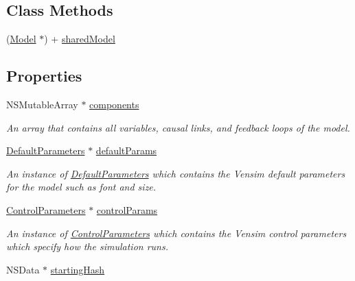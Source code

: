 \subsection*{Class Methods}
\begin{DoxyCompactItemize}
\item 
(\hyperlink{interface_model}{Model} $\ast$) + \hyperlink{interface_model_a4f1d39e1881443e4ecd87d660e9c91b4}{shared\-Model}
\end{DoxyCompactItemize}
\subsection*{Properties}
\begin{DoxyCompactItemize}
\item 
\hypertarget{interface_model_a84e232bb9b9692876f48dc2e95c8c2ab}{N\-S\-Mutable\-Array $\ast$ \hyperlink{interface_model_a84e232bb9b9692876f48dc2e95c8c2ab}{components}}\label{interface_model_a84e232bb9b9692876f48dc2e95c8c2ab}

\begin{DoxyCompactList}\small\item\em An array that contains all variables, causal links, and feedback loops of the model. \end{DoxyCompactList}\item 
\hypertarget{interface_model_a4be35dd9732f61e8d31f36497e615ac4}{\hyperlink{interface_default_parameters}{Default\-Parameters} $\ast$ \hyperlink{interface_model_a4be35dd9732f61e8d31f36497e615ac4}{default\-Params}}\label{interface_model_a4be35dd9732f61e8d31f36497e615ac4}

\begin{DoxyCompactList}\small\item\em An instance of \hyperlink{interface_default_parameters}{Default\-Parameters} which contains the Vensim default parameters for the model such as font and size. \end{DoxyCompactList}\item 
\hypertarget{interface_model_a2be19c9425d7cfdc74424a9afbdbd9de}{\hyperlink{interface_control_parameters}{Control\-Parameters} $\ast$ \hyperlink{interface_model_a2be19c9425d7cfdc74424a9afbdbd9de}{control\-Params}}\label{interface_model_a2be19c9425d7cfdc74424a9afbdbd9de}

\begin{DoxyCompactList}\small\item\em An instance of \hyperlink{interface_control_parameters}{Control\-Parameters} which contains the Vensim control parameters which specify how the simulation runs. \end{DoxyCompactList}\item 
\hypertarget{interface_model_ad6dba38c5d11da948afdddbd0a6e2caa}{N\-S\-Data $\ast$ \hyperlink{interface_model_ad6dba38c5d11da948afdddbd0a6e2caa}{starting\-Hash}}\label{interface_model_ad6dba38c5d11da948afdddbd0a6e2caa}


\end{DoxyCompactItemize}
